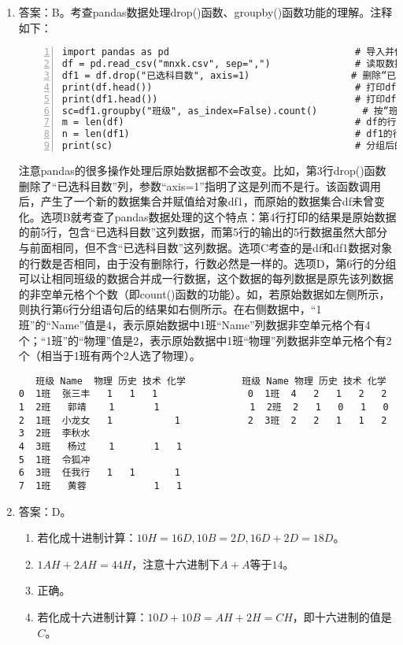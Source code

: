 \begin{enumerate}
\item 答案：B。考查pandas数据处理drop()函数、groupby()函数功能的理解。注释如下：
\begin{lstlisting}[numbers=left]
import pandas as pd									# 导入并使用pd作为别名
df = pd.read_csv("mnxk.csv", sep=",")				# 读取数据
df1 = df.drop("已选科目数", axis=1)				    # 删除“已选科目数”列
print(df.head())									# 打印df的前5行
print(df1.head())									# 打印df1的前5行
sc=df1.groupby("班级", as_index=False).count()	    # 按“班级”分组
m = len(df)											# df的行数
n = len(df1)										# df1的行数
print(sc)											# 分组后的数据
\end{lstlisting}
注意pandas的很多操作处理后原始数据都不会改变。比如，第3行drop()函数删除了“已选科目数”列，参数“axis=1”指明了这是列而不是行。该函数调用后，产生了一个新的数据集合并赋值给对象df1，而原始的数据集合df未曾变化。选项B就考查了pandas数据处理的这个特点：第4行打印的结果是原始数据的前5行，包含“已选科目数”这列数据，而第5行的输出的5行数据虽然大部分与前面相同，但不含“已选科目数”这列数据。选项C考查的是df和df1数据对象的行数是否相同，由于没有删除行，行数必然是一样的。选项D，第6行的分组可以让相同班级的数据合并成一行数据，这个数据的每列数据是原先该列数据的非空单元格个个数（即count()函数的功能）。如，若原始数据如左侧所示，则执行第6行分组语句后的结果如右侧所示。在右侧数据中，“1班”的“Name”值是4，表示原始数据中1班“Name”列数据非空单元格个有4个；“1班”的“物理”值是2，表示原始数据中1班“物理”列数据非空单元格个有2个（相当于1班有两个2人选了物理）。
\begin{lstlisting}
   班级 Name  物理 历史 技术 化学          班级 Name 物理 历史 技术 化学
0  1班  张三丰   1   1   1                0  1班  4   2   1   2   2
1  2班   郭靖    1       1                1  2班  2   1   0   1   0
2  1班  小龙女   1           1            2  3班  2   2   1   1   2
3  2班  李秋水                
4  3班   杨过    1       1   1
5  1班  令狐冲                
6  3班  任我行   1   1       1
7  1班   黄蓉            1   1
\end{lstlisting}

\item 答案：D。
	\begin{enumerate}[label=\Alph*.]
	\item 若化成十进制计算：$10H=16D, 10B = 2D, 16D+2D=18D$。
	\item $1AH + 2AH = 44H$，注意十六进制下$A + A$等于$14$。
	\item 正确。
	\item 若化成十六进制计算：$10D + 10B = AH + 2H = CH$，即十六进制的值是$C$。
	\end{enumerate}


\end{enumerate}

